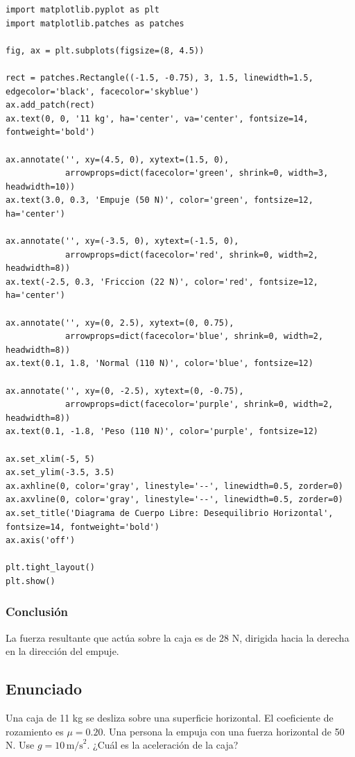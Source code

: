 \documentclass[12pt]{article}
\begin{document}
\begin{lstlisting}
import matplotlib.pyplot as plt
import matplotlib.patches as patches

fig, ax = plt.subplots(figsize=(8, 4.5))

rect = patches.Rectangle((-1.5, -0.75), 3, 1.5, linewidth=1.5, edgecolor='black', facecolor='skyblue')
ax.add_patch(rect)
ax.text(0, 0, '11 kg', ha='center', va='center', fontsize=14, fontweight='bold')

ax.annotate('', xy=(4.5, 0), xytext=(1.5, 0), 
            arrowprops=dict(facecolor='green', shrink=0, width=3, headwidth=10))
ax.text(3.0, 0.3, 'Empuje (50 N)', color='green', fontsize=12, ha='center')

ax.annotate('', xy=(-3.5, 0), xytext=(-1.5, 0), 
            arrowprops=dict(facecolor='red', shrink=0, width=2, headwidth=8))
ax.text(-2.5, 0.3, 'Friccion (22 N)', color='red', fontsize=12, ha='center')

ax.annotate('', xy=(0, 2.5), xytext=(0, 0.75), 
            arrowprops=dict(facecolor='blue', shrink=0, width=2, headwidth=8))
ax.text(0.1, 1.8, 'Normal (110 N)', color='blue', fontsize=12)

ax.annotate('', xy=(0, -2.5), xytext=(0, -0.75), 
            arrowprops=dict(facecolor='purple', shrink=0, width=2, headwidth=8))
ax.text(0.1, -1.8, 'Peso (110 N)', color='purple', fontsize=12)

ax.set_xlim(-5, 5)
ax.set_ylim(-3.5, 3.5)
ax.axhline(0, color='gray', linestyle='--', linewidth=0.5, zorder=0)
ax.axvline(0, color='gray', linestyle='--', linewidth=0.5, zorder=0)
ax.set_title('Diagrama de Cuerpo Libre: Desequilibrio Horizontal', fontsize=14, fontweight='bold')
ax.axis('off')

plt.tight_layout()
plt.show()
\end{lstlisting}

\subsubsection*{Conclusión}
La fuerza resultante que actúa sobre la caja es de 28 N, dirigida hacia la derecha en la dirección del empuje.

\newpage

\subsection*{Enunciado}
Una caja de 11 kg se desliza sobre una superficie horizontal. El coeficiente de rozamiento es $\mu = 0.20$. Una persona la empuja con una fuerza horizontal de 50 N. Use $g = 10 \, \text{m/s}^2$. ¿Cuál es la aceleración de la caja?
\end{document}
